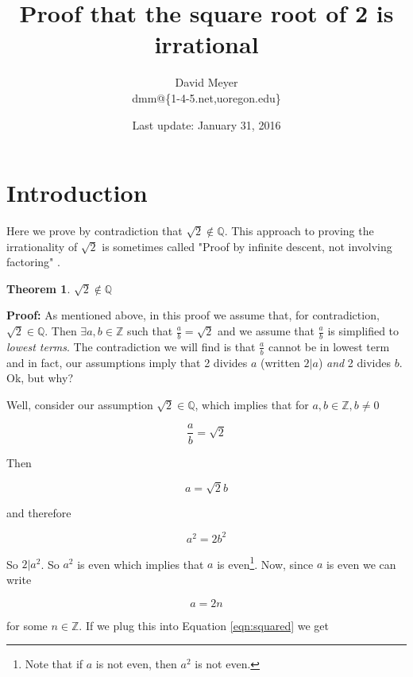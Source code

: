 \documentclass[11pt, oneside]{article}   	%
\title{Proof that the square root of 2 is irrational}
\author{David Meyer \\ dmm@\{1-4-5.net,uoregon.edu\}}
\date{Last update: January 31, 2016}							%
\theoremstyle{definition}
\newtheorem{thm}{Theorem}[section]
\begin{document}
\maketitle

\section{Introduction}
Here we prove by contradiction that $\sqrt{2} \notin \mathbb{Q}$. This approach to proving the irrationality of $\sqrt{2}$ is sometimes called
"Proof by infinite descent, not involving factoring" \cite{wiki:sqrt2}.

\begin{thm}
$\sqrt{2} \notin \mathbb{Q}$
\end{thm}

\noindent
\textbf{Proof:} As mentioned above, in this proof we assume that, for contradiction,  $\sqrt{2} \in \mathbb{Q}$. Then $\exists a,b  \in \mathbb{Z}$
such that $\frac{a}{b} = \sqrt{2}$ and  we assume that $\frac{a}{b}$ is simplified to \emph{lowest terms}. The contradiction we will find is that 
$\frac{a}{b}$ cannot be in lowest term and in fact, our assumptions imply that 2 divides $a$ (written $2|a$) \emph{and}  2 divides $b$. Ok, but why?


\bigskip
\noindent
Well, consider our assumption $\sqrt{2} \in \mathbb{Q}$, which implies that for $a,b \in \mathbb{Z}, b \neq 0$

\bigskip
\begin{equation*}
\frac{a}{b} = \sqrt{2}
\end{equation*}


\bigskip
\noindent
Then 

\begin{equation*}
a = \sqrt{2} b
\end{equation*}

\bigskip
\noindent
and therefore 

\begin{equation}
a^2 = 2b^2
\label{eqn:squared}
\end{equation}

\bigskip
\noindent
So $2|a^2$. So $a^2$ is even which implies that $a$ is even\footnote{Note that if $a$ is not even, then $a^2$ is not even.}. Now, since $a$ is even we can
write 

\begin{equation}
a = 2n
\label{eqn:a}
\end{equation}

\bigskip
\noindent
for some $n \in \mathbb{Z}$. If we plug this into Equation \ref{eqn:squared} we get
\end{document}
